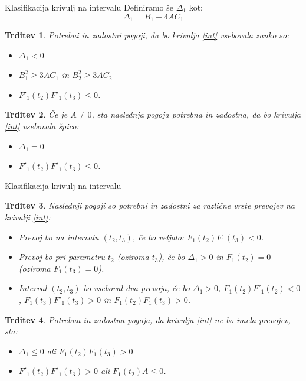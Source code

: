 \documentclass{beamer} %
\newtheorem{trditev}{Trditev}
\begin{document}
\begin{frame}{Klasifikacija krivulj na intervalu}
	Definiramo še $\Delta_1$ kot:
	\[  \Delta_1= B_1 - 4AC_1 \]
	\begin{trditev}
		Potrebni in zadostni pogoji, da bo krivulja \eqref{int} vsebovala zanko so:
		\begin{itemize}
			\item  $\Delta_1 <0$
			\item $B^2_1 \geq 3AC_1$ in $B^2_2 \geq 3AC_2$
			\item $F'_1(t_2) F'_1(t_3) \leq 0$.
		\end{itemize}
	\end{trditev}
	\begin{trditev}
	Če je $A \neq 0$, sta naslednja pogoja potrebna in zadostna, da bo krivulja \eqref{int} vsebovala špico:
	\begin{itemize}
		\item  $\Delta_1 =0$
		\item $F'_1(t_2) F'_1(t_3) \leq 0$.
	\end{itemize}
\end{trditev}
\end{frame}

\begin{frame}{Klasifikacija krivulj na intervalu}
	\begin{trditev}
		Naslednji pogoji so potrebni in zadostni za različne vrste prevojev na krivulji \eqref{int}:
		\begin{itemize}
			\item Prevoj bo na intervalu $(t_2, t_3)$, če bo veljalo:
			$F_1(t_2)F_1(t_3) <0$.
			\item Prevoj bo pri parametru $t_2$ (oziroma $t_3$), če bo
			$\Delta_1 > 0$ in $F_1(t_2) = 0$ (oziroma $F_1(t_3) = 0$).
			\item Interval $(t_2, t_3)$ bo vseboval dva prevoja, če bo $\Delta_1 >0 $, $F_1(t_2)F'_1(t_2) <0$, $F_1(t_3)F'_1(t_3) >0$ in $F_1(t_2)F_1(t_3) >0$. 
		\end{itemize}
	\end{trditev}
	\begin{trditev}
		Potrebna in zadostna pogoja, da krivulja \eqref{int} ne bo imela prevojev, sta:
		\begin{itemize}
			\item $\Delta_1 \leq 0$ ali $F_1(t_2)F_1(t_3) > 0$
			\item $F'_1(t_2)F'_1(t_3)>0$ ali $F_1(t_2)A \leq 0$.
		\end{itemize}
	\end{trditev}
\end{frame}
\end{document}
